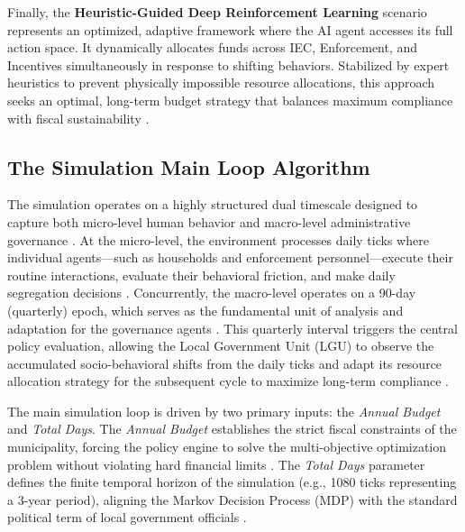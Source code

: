 Finally, the \textbf{Heuristic-Guided Deep Reinforcement Learning} scenario represents an optimized, adaptive framework where the AI agent accesses its full action space. It dynamically allocates funds across IEC, Enforcement, and Incentives simultaneously in response to shifting behaviors. Stabilized by expert heuristics to prevent physically impossible resource allocations, this approach seeks an optimal, long-term budget strategy that balances maximum compliance with fiscal sustainability \citep{MuZhang2021, Zhao2022, TianReview2024}.

\subsection{The Simulation Main Loop Algorithm}
The simulation operates on a highly structured dual timescale designed to capture both micro-level human behavior and macro-level administrative governance \citep{Brugiere2022}. At the micro-level, the environment processes daily ticks where individual agents---such as households and enforcement personnel---execute their routine interactions, evaluate their behavioral friction, and make daily segregation decisions \citep{Meng2018}.  Concurrently, the macro-level operates on a 90-day (quarterly) epoch, which serves as the fundamental unit of analysis and adaptation for the governance agents \citep{Akbarpour2021}. This quarterly interval triggers the central policy evaluation, allowing the Local Government Unit (LGU) to observe the accumulated socio-behavioral shifts from the daily ticks and adapt its resource allocation strategy for the subsequent cycle to maximize long-term compliance \citep{Jimenez2025}.

The main simulation loop is driven by two primary inputs: the \textit{Annual Budget} and \textit{Total Days}. The \textit{Annual Budget} establishes the strict fiscal constraints of the municipality, forcing the policy engine to solve the multi-objective optimization problem without violating hard financial limits \citep{Abdallah2021}. The \textit{Total Days} parameter defines the finite temporal horizon of the simulation (e.g., 1080 ticks representing a 3-year period), aligning the Markov Decision Process (MDP) with the standard political term of local government officials \citep{Akbarpour2021}.


